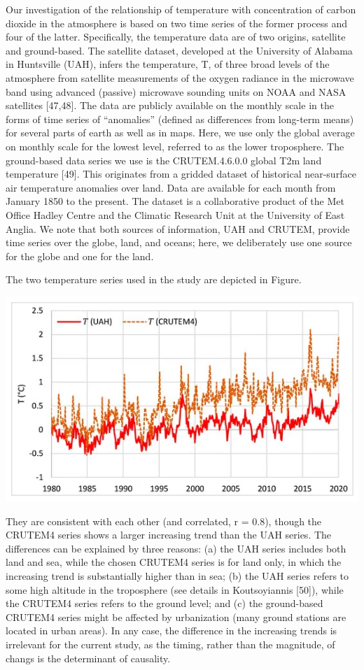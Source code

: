 \documentclass[
]{book}
\begin{document}
Our investigation of the relationship of temperature with concentration of carbon dioxide in
the atmosphere is based on two time series of the former process and four of the latter. Specifically,
the temperature data are of two origins, satellite and ground-based. The satellite dataset, developed
at the University of Alabama in Huntsville (UAH), infers the temperature, T, of three broad levels
of the atmosphere from satellite measurements of the oxygen radiance in the microwave band using
advanced (passive) microwave sounding units on NOAA and NASA satellites {[}47,48{]}. The data are
publicly available on the monthly scale in the forms of time series of ``anomalies'' (defined as differences
from long-term means) for several parts of earth as well as in maps. Here, we use only the global
average on monthly scale for the lowest level, referred to as the lower troposphere. The ground-based
data series we use is the CRUTEM.4.6.0.0 global T2m land temperature {[}49{]}. This originates from a
gridded dataset of historical near-surface air temperature anomalies over land. Data are available for
each month from January 1850 to the present. The dataset is a collaborative product of the Met Office Hadley Centre and the Climatic Research Unit at the University of East Anglia. We note that both
sources of information, UAH and CRUTEM, provide time series over the globe, land, and oceans; here,
we deliberately use one source for the globe and one for the land.

The two temperature series used in the study are depicted in Figure.

\includegraphics{fig/UAH_vs_CRUTEM4.png}

They are consistent with
each other (and correlated, r = 0.8), though the CRUTEM4 series shows a larger increasing trend than
the UAH series. The differences can be explained by three reasons: (a) the UAH series includes both
land and sea, while the chosen CRUTEM4 series is for land only, in which the increasing trend is
substantially higher than in sea; (b) the UAH series refers to some high altitude in the troposphere
(see details in Koutsoyiannis {[}50{]}), while the CRUTEM4 series refers to the ground level; and (c) the
ground-based CRUTEM4 series might be affected by urbanization (many ground stations are located
in urban areas). In any case, the difference in the increasing trends is irrelevant for the current study,
as the timing, rather than the magnitude, of changs is the determinant of causality.
\end{document}
